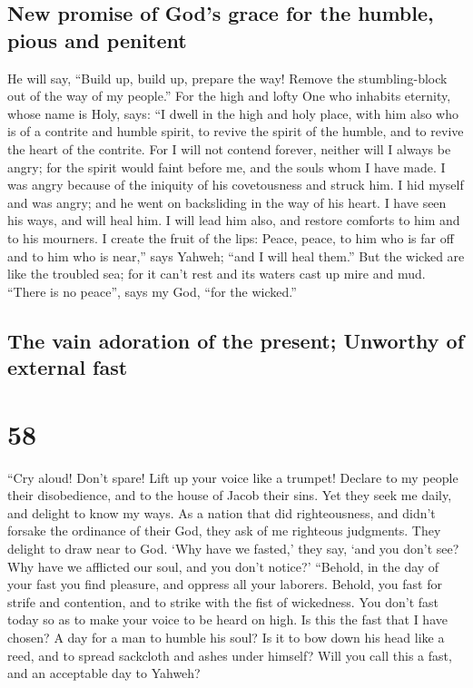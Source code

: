 \hypertarget{new-promise-of-gods-grace-for-the-humble-pious-and-penitent}{%
\subsection{New promise of God's grace for the humble, pious and
penitent}\label{new-promise-of-gods-grace-for-the-humble-pious-and-penitent}}

 He will say, ``Build up, build up, prepare the way!
Remove the stumbling-block out of the way of my people.''
 For the high and lofty One who inhabits eternity, whose
name is Holy, says: ``I dwell in the high and holy place, with him also
who is of a contrite and humble spirit, to revive the spirit of the
humble, and to revive the heart of the contrite.  For I
will not contend forever, neither will I always be angry; for the spirit
would faint before me, and the souls whom I have made.  I
was angry because of the iniquity of his covetousness and struck him. I
hid myself and was angry; and he went on backsliding in the way of his
heart.  I have seen his ways, and will heal him. I will
lead him also, and restore comforts to him and to his mourners.
 I create the fruit of the lips: Peace, peace, to him who
is far off and to him who is near,'' says Yahweh; ``and I will heal
them.''  But the wicked are like the troubled sea; for it
can't rest and its waters cast up mire and mud.  ``There
is no peace'', says my God, ``for the wicked.''

\hypertarget{the-vain-adoration-of-the-present-unworthy-of-external-fast}{%
\subsection{The vain adoration of the present; Unworthy of external
fast}\label{the-vain-adoration-of-the-present-unworthy-of-external-fast}}

\hypertarget{section-57}{%
\section{58}\label{section-57}}

 ``Cry aloud! Don't spare! Lift up your voice like a
trumpet! Declare to my people their disobedience, and to the house of
Jacob their sins.  Yet they seek me daily, and delight to
know my ways. As a nation that did righteousness, and didn't forsake the
ordinance of their God, they ask of me righteous judgments. They delight
to draw near to God.  `Why have we fasted,' they say, `and
you don't see? Why have we afflicted our soul, and you don't notice?'
``Behold, in the day of your fast you find pleasure, and oppress all
your laborers.  Behold, you fast for strife and
contention, and to strike with the fist of wickedness. You don't fast
today so as to make your voice to be heard on high.  Is
this the fast that I have chosen? A day for a man to humble his soul? Is
it to bow down his head like a reed, and to spread sackcloth and ashes
under himself? Will you call this a fast, and an acceptable day to
Yahweh?

